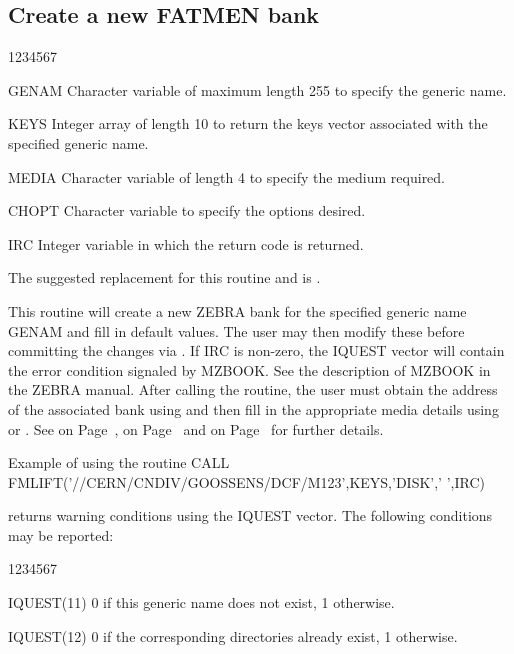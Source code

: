 \subsection{Create a new FATMEN bank}
\begin{DLtt}{1234567}
\item[GENAM]
Character variable of maximum length 255 to specify the generic name.
\item[KEYS]
Integer array of length 10 to return the keys vector associated
with the specified generic name.
\item[MEDIA]
Character variable of length 4 to specify the medium required.
\item[CHOPT]
Character variable to specify the options desired.
\item[IRC]
Integer variable in which the return code is returned.
\end{DLtt}
\par 
The suggested replacement for this routine and  is .
\par
This routine will create a new ZEBRA bank for the specified
generic name GENAM and fill in default values.
The user may then modify these before
committing the changes via .
If IRC is non-zero, the IQUEST vector will contain the error condition
signaled by MZBOOK. See the description of MZBOOK in the ZEBRA manual.
After calling the  routine, the user must obtain the address
of the associated bank using  and then fill in the appropriate
media details using  or .
See on Page~\pageref{FMLINK}, on Page~\pageref{FMALLO} and
on Page~\pageref{FUALLO} for further details.
\begin{XMPt}{Example of using the \protect{} routine}
      CALL FMLIFT('//CERN/CNDIV/GOOSSENS/DCF/M123',KEYS,'DISK',' ',IRC)
\end{XMPt}
\par
{} returns warning conditions using the IQUEST vector.
The following conditions may be reported:
\begin{DLtt}{1234567}
\item[IQUEST(11)]0 if this generic name does not exist, 1 otherwise.
\item[IQUEST(12) ]
0 if the corresponding directories already exist, 1 otherwise.
\end{DLtt}
